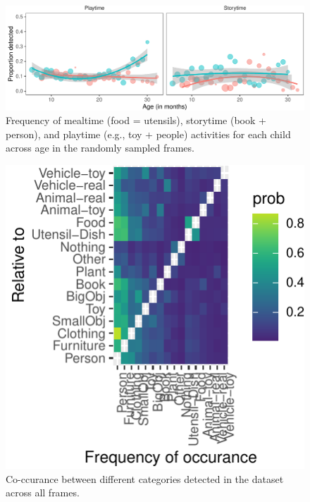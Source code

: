 \documentclass[10pt, letterpaper]{article}
\newenvironment{CodeChunk}{}{}
\begin{document}
\begin{CodeChunk}
\begin{figure}[h]

{\centering \includegraphics{figs/activities-1} 

}

\caption[Frequency of mealtime (food = utensils), storytime (book + person), and playtime (e.g., toy + people) activities for each child across age in the randomly sampled frames]{Frequency of mealtime (food = utensils), storytime (book + person), and playtime (e.g., toy + people) activities for each child across age in the randomly sampled frames. }\label{fig:activities}
\end{figure}
\end{CodeChunk}

\begin{CodeChunk}
\begin{figure}[h]

{\centering \includegraphics{figs/coocc_stats-1} 

}

\caption[Co-ccurance between different categories detected in the dataset across all frames]{Co-ccurance between different categories detected in the dataset across all frames. }\label{fig:coocc_stats}
\end{figure}
\end{CodeChunk}
\end{document}
